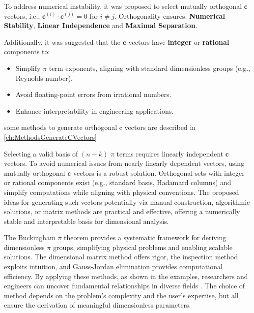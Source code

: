 To address numerical instability, it was proposed to select mutually orthogonal $\mathbf{c}$ vectors, i.e., $\mathbf{c}^{(i)} \cdot \mathbf{c}^{(j)} = 0$ for $i \neq j$. Orthogonality ensures:
\textbf{Numerical Stability}, \textbf{Linear Independence} and \textbf{Maximal Separation}.

Additionally, it was suggested that the $\mathbf{c}$ vectors have \textbf{integer} or \textbf{rational} components to:
\begin{itemize}
    \item Simplify $\pi$ term exponents, aligning with standard dimensionless groups (e.g., Reynolds number).
    \item Avoid floating-point errors from irrational numbers.
    \item Enhance interpretability in engineering applications.
\end{itemize}

some methods to generate orthogonal c vectors are described in \ref{ch:MethodsGenerateCVectors}


\begin{remarkbox}
\begin{remarkT}
\label{sec:conclusiona}
Selecting a valid basis of $(n - k)$ $\pi$ terms requires linearly independent $\mathbf{c}$ vectors. To avoid numerical issues from nearly linearly dependent vectors, using mutually orthogonal $\mathbf{c}$ vectors is a robust solution. Orthogonal sets with integer or rational components exist (e.g., standard basis, Hadamard columns) and simplify computations while aligning with physical conventions. The proposed ideas for generating such vectors potentially via manual construction, algorithmic solutions, or matrix methods are practical and effective, offering a numerically stable and interpretable basis for dimensional analysis.
\end{remarkT}
\end{remarkbox}

\begin{remarkbox}
\begin{remarkT}
The Buckingham $\pi$ theorem provides a systematic framework for deriving dimensionless $\pi$ groups, simplifying physical problems and enabling scalable solutions. The dimensional matrix method offers rigor, the inspection method exploits intuition, and Gauss-Jordan elimination provides computational efficiency. By applying these methods, as shown in the examples, researchers and engineers can uncover fundamental relationships in diverse fields \cite{Sonin2004}. The choice of method depends on the problem's complexity and the user's expertise, but all ensure the derivation of meaningful dimensionless parameters.
\end{remarkT}
\end{remarkbox}

